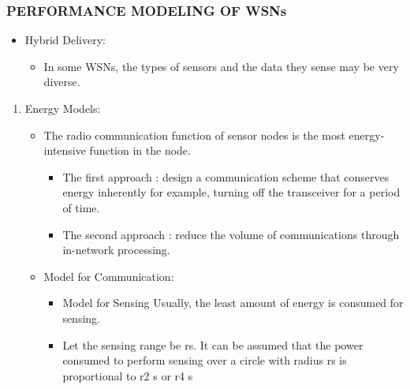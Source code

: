 \documentclass[11pt]{beamer}
\begin{document}
				\begin{frame}
						\frametitle{PERFORMANCE MODELING OF WSNs}
					\begin{itemize}
						\item Hybrid Delivery:
						\begin{itemize}
						\item In some WSNs, the types of sensors and the data they sense may be very diverse.
                     \end{itemize}
					\end{itemize}
					\begin{enumerate}
						\item Energy Models:
						\begin{itemize}
						\item The radio communication function of sensor nodes is the most energy-intensive function in the node.
						\begin{itemize}
						\item The first approach   : design a communication scheme that conserves energy inherently for example, turning off the transceiver for a period of time.
						\item The second approach : reduce the volume of communications through in-network processing.
						\end{itemize}
						\item Model for Communication:
						 \begin{itemize}
						 	\item Model for Sensing Usually, the least amount of energy is consumed for sensing.
						 	\item  Let the sensing range be rs. It can be assumed that the power consumed to perform sensing over a circle with radius rs is proportional to r2 s or r4 s
						 	\end{itemize}
						 	\end{itemize}
						 	\end{enumerate}
						 	\end{frame}
\end{document}
